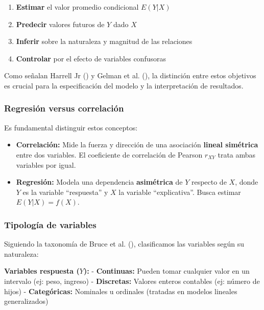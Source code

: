 \documentclass[
  oneside]{book}
\providecommand{\tightlist}{%
  \setlength{\itemsep}{0pt}\setlength{\parskip}{0pt}}
\begin{document}
\begin{enumerate}
\def\labelenumi{\arabic{enumi}.}
\tightlist
\item
  \textbf{Estimar} el valor promedio condicional \(E(Y|X)\)
\item
  \textbf{Predecir} valores futuros de \(Y\) dado \(X\)
\item
  \textbf{Inferir} sobre la naturaleza y magnitud de las relaciones
\item
  \textbf{Controlar} por el efecto de variables confusoras
\end{enumerate}

Como señalan Harrell Jr () y Gelman et al. (), la distinción entre estos objetivos es crucial para la especificación del modelo y la interpretación de resultados.

\subsubsection{Regresión versus correlación}\label{regresiuxf3n-versus-correlaciuxf3n}

Es fundamental distinguir estos conceptos:

\begin{itemize}
\item
  \textbf{Correlación:} Mide la fuerza y dirección de una asociación \textbf{lineal simétrica} entre dos variables. El coeficiente de correlación de Pearson \(r_{XY}\) trata ambas variables por igual.
\item
  \textbf{Regresión:} Modela una dependencia \textbf{asimétrica} de \(Y\) respecto de \(X\), donde \(Y\) es la variable ``respuesta'' y \(X\) la variable ``explicativa''. Busca estimar \(E(Y|X) = f(X)\).
\end{itemize}

\subsubsection{Tipología de variables}\label{tipologuxeda-de-variables}

Siguiendo la taxonomía de Bruce et al. (), clasificamos las variables según su naturaleza:

\textbf{Variables respuesta (\(Y\)):}
- \textbf{Continuas:} Pueden tomar cualquier valor en un intervalo (ej: peso, ingreso)
- \textbf{Discretas:} Valores enteros contables (ej: número de hijos)
- \textbf{Categóricas:} Nominales u ordinales (tratadas en modelos lineales generalizados)
\end{document}
